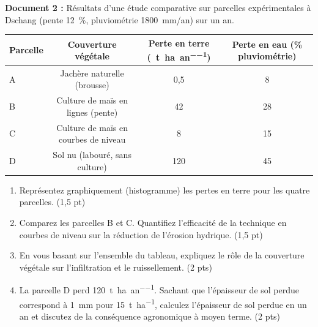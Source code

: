 \documentclass[11pt]{article}
\begin{document}
\begin{exercice}
\textbf{Document 2 :} Résultats d'une étude comparative sur parcelles expérimentales à Dschang (pente \SI{12}{\percent}, pluviométrie \SI{1800}{\milli\meter/an}) sur un an.

\begin{tabular}{|l|c|c|c|}
\hline
\textbf{Parcelle} & \textbf{Couverture végétale} & \textbf{Perte en terre (\SI{}{\tonne\per\hectare\per an})} & \textbf{Perte en eau (\% pluviométrie)} \\
\hline
A & Jachère naturelle (brousse) & 0,5 & 8 \\
B & Culture de maïs en lignes (pente) & 42 & 28 \\
C & Culture de maïs en courbes de niveau & 8 & 15 \\
D & Sol nu (labouré, sans culture) & 120 & 45 \\
\hline
\end{tabular}
\begin{enumerate}
    \item Représentez graphiquement (histogramme) les pertes en terre pour les quatre parcelles. (1,5 pt)
    \item Comparez les parcelles B et C. Quantifiez l'efficacité de la technique en courbes de niveau sur la réduction de l'érosion hydrique. (1,5 pt)
    \item En vous basant sur l'ensemble du tableau, expliquez le rôle de la couverture végétale sur l'infiltration et le ruissellement. (2 pts)
    \item La parcelle D perd \SI{120}{\tonne\per\hectare\per an}. Sachant que l'épaisseur de sol perdue correspond à \SI{1}{\milli\meter} pour \SI{15}{\tonne\per\hectare}, calculez l'épaisseur de sol perdue en un an et discutez de la conséquence agronomique à moyen terme. (2 pts)
\end{enumerate}
\end{exercice}
\end{document}

